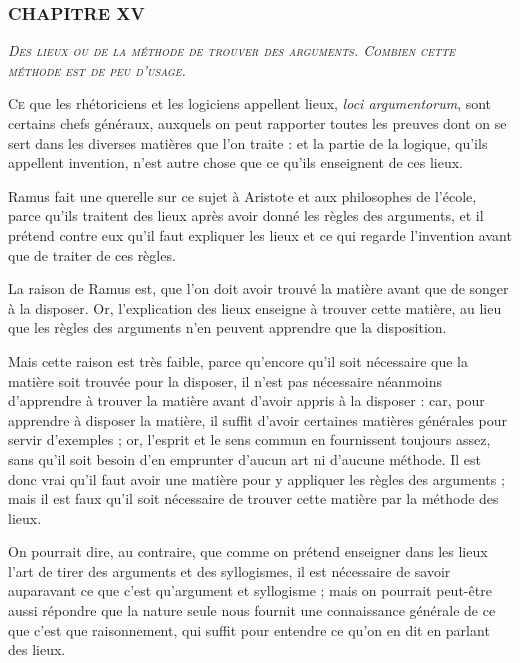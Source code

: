 \subsubsection{\centering \Large CHAPITRE XV}
\begin{center}\emph{\large\scshape Des lieux ou de la méthode de trouver des arguments. Combien cette méthode est de peu d'usage.}\end{center}

	\lettrine{C}{e} que les rhétoriciens et les logiciens appellent lieux, \emph{loci argumentorum}, sont certains chefs généraux, auxquels on peut rapporter toutes les preuves dont on se sert dans les diverses matières que l'on traite : et la partie de la logique, qu'ils appellent invention, n'est autre chose que ce qu'ils enseignent de ces lieux.

Ramus fait une querelle sur ce sujet à Aristote et aux philosophes de l'école, parce qu'ils traitent des lieux après avoir donné les règles des arguments, et il prétend contre eux qu'il faut expliquer les lieux et ce qui regarde l'invention avant que de traiter de ces règles.

La raison de Ramus est, que l'on doit avoir trouvé la matière avant que de songer à la disposer. Or, l'explication des lieux enseigne à trouver cette matière, au lieu que les règles des arguments n'en peuvent apprendre que la disposition.

Mais cette raison est très faible, parce qu'encore qu'il soit nécessaire que la matière soit trouvée pour la disposer, il n'est pas nécessaire néanmoins d'apprendre à trouver la matière avant d'avoir appris à la disposer : car, pour apprendre à disposer la matière, il suffit d'avoir certaines matières générales pour servir d'exemples ; or, l'esprit et le sens commun en fournissent toujours assez, sans qu'il soit besoin d'en emprunter d'aucun art ni d'aucune méthode. Il est donc vrai qu'il faut avoir une matière pour y appliquer les règles des arguments ; mais il est faux qu'il soit nécessaire de trouver cette matière par la méthode des lieux.

On pourrait dire, au contraire, que comme on prétend enseigner dans les lieux l'art de tirer des arguments et des syllogismes, il est nécessaire de savoir auparavant ce que c'est qu'argument et syllogisme ; mais on pourrait peut-être aussi répondre que la nature seule nous fournit une connaissance générale de ce que c'est que raisonnement, qui suffit pour entendre ce qu'on en dit en parlant des lieux.

